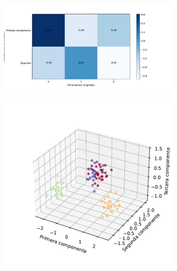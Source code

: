 \begin{figure}[]
  \centering
  \begin{subfigure}{\textwidth}
    \centering
    \includegraphics[width=\textwidth]{figures/pca-color-ponderation.pdf}
    \caption{}
    \label{fig:pca-color-ponderation}
  \end{subfigure}
  \begin{subfigure}{0.45\textwidth}
    \centering
    \includegraphics[width=\textwidth]{figures/pca-3d-labeled.pdf}
    \caption{}
    \label{fig:pca-3d-labeled}
  \end{subfigure}
  \begin{subfigure}{0.45\textwidth}
    \centering

\end{subfigure}
\end{figure}
